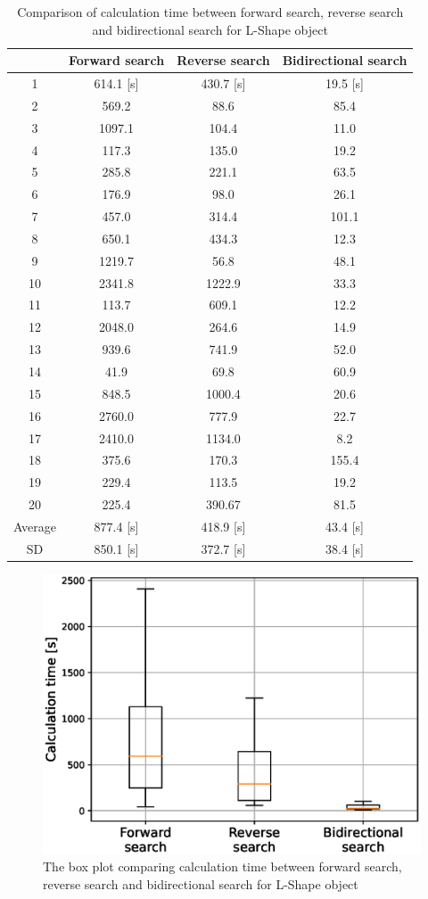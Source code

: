 \documentclass[a4paper,twoside,12pt,papersize, dvipdfmx]{iirthesis}
\begin{document}
\begin{table}[t]
    \centering
    \caption{Comparison of calculation time between forward search, reverse search and bidirectional search for L-Shape object}
    \label{tab::planner::LFB}
    \begin{tabular}{|c|c|c|c|}
    \hline
        ~ & Forward search & Reverse search & Bidirectional search \\ \hline
        1 & 614.1 [s] & 430.7 [s] & 19.5 [s] \\ \hline
        2 & 569.2 & 88.6& 85.4 \\ \hline
        3 & 1097.1 & 104.4 & 11.0 \\ \hline
        4 & 117.3 & 135.0 & 19.2 \\ \hline
        5 & 285.8 & 221.1 & 63.5 \\ \hline
        6 & 176.9 & 98.0 & 26.1 \\ \hline
        7 & 457.0 & 314.4 & 101.1 \\ \hline
        8 & 650.1 & 434.3 & 12.3 \\ \hline
        9 & 1219.7 & 56.8 & 48.1 \\ \hline
        10 & 2341.8 & 1222.9 & 33.3 \\ \hline
        11 & 113.7 & 609.1 & 12.2 \\ \hline
        12 & 2048.0 & 264.6 & 14.9 \\ \hline
        13 & 939.6 & 741.9 & 52.0 \\ \hline
        14 & 41.9 & 69.8 & 60.9 \\ \hline
        15 & 848.5 & 1000.4 & 20.6 \\ \hline
        16 & 2760.0 & 777.9 & 22.7 \\ \hline
        17 & 2410.0 & 1134.0 & 8.2 \\ \hline
        18 & 375.6 & 170.3 & 155.4 \\ \hline
        19 & 229.4 & 113.5 & 19.2 \\ \hline
        20 & 225.4 & 390.67 & 81.5 \\ \hline
        Average & 877.4 [s]  & 418.9 [s] & 43.4 [s] \\ \hline
        SD & 850.1 [s] & 372.7 [s] & 38.4 [s] \\ \hline
    \end{tabular}
\end{table}
\begin{figure}[bt]
\centering
\includegraphics[width=0.5\hsize]{fig/3-new-planner/3_4_1.eps}
\caption{The box plot comparing calculation time between forward search, reverse search and bidirectional search for L-Shape object}
\label{fig::planner::LFB}
\end{figure}
\end{document}
